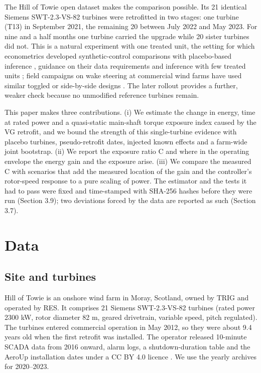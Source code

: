 \documentclass[preprint,12pt]{elsarticle}
\begin{document}
The Hill of Towie open dataset \cite{hot} makes the comparison possible. Its 21 identical Siemens SWT-2.3-VS-82 turbines were retrofitted in two stages: one turbine (T13) in September 2021, the remaining 20 between July 2022 and May 2023. For nine and a half months one turbine carried the upgrade while 20 sister turbines did not. This is a natural experiment with one treated unit, the setting for which econometrics developed synthetic-control comparisons with placebo-based inference \cite{abadie10}, guidance on their data requirements \cite{abadie21} and inference with few treated units \cite{conley11}; field campaigns on wake steering at commercial wind farms have used similar toggled or side-by-side designs \cite{fleming19}. The later rollout provides a further, weaker check because no unmodified reference turbines remain.

This paper makes three contributions. (i) We estimate the change in energy, time at rated power and a quasi-static main-shaft torque exposure index caused by the VG retrofit, and we bound the strength of this single-turbine evidence with placebo turbines, pseudo-retrofit dates, injected known effects and a farm-wide joint bootstrap. (ii) We report the exposure ratio C and where in the operating envelope the energy gain and the exposure arise. (iii) We compare the measured C with scenarios that add the measured location of the gain and the controller's rotor-speed response to a pure scaling of power. The estimator and the tests it had to pass were fixed and time-stamped with SHA-256 hashes before they were run (Section 3.9); two deviations forced by the data are reported as such (Section 3.7).

\section{Data}

\subsection{Site and turbines}

Hill of Towie is an onshore wind farm in Moray, Scotland, owned by TRIG and operated by RES. It comprises 21 Siemens SWT-2.3-VS-82 turbines (rated power 2300 kW, rotor diameter 82 m, geared drivetrain, variable speed, pitch regulated). The turbines entered commercial operation in May 2012, so they were about 9.4 years old when the first retrofit was installed. The operator released 10-minute SCADA data from 2016 onward, alarm logs, a shutdown-duration table and the AeroUp installation dates under a CC BY 4.0 licence \cite{hot}. We use the yearly archives for 2020--2023.
\end{document}
